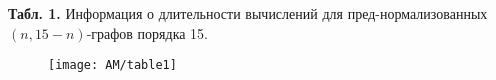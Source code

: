 \noindent \textbf{Табл. 1.} Информация о длительности вычислений для пред-нормализованных  $(n,15-n)${}-графов порядка 15.\label{AKM_ch1_tab1}
\begin{figure}[H]
	\centering
	\texttt{[image: AM/table1]}
\end{figure}
